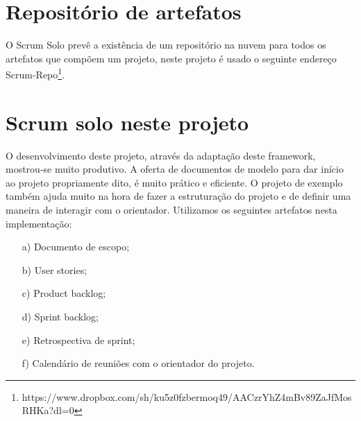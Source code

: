 \section{Repositório de artefatos}
O Scrum Solo prevê a existência de um repositório na nuvem para todos os artefatos que compõem um projeto, neste projeto é usado o seguinte endereço Scrum-Repo\footnote{https://www.dropbox.com/sh/ku5z0fzbermoq49/AACzrYhZ4mBv89ZaJfMosRHKa?dl=0}.

\section{Scrum solo neste projeto}
O desenvolvimento deste projeto, através da adaptação deste framework, mostrou-se muito produtivo. A oferta de documentos de modelo para dar início ao projeto propriamente dito, é muito prático e eficiente. O projeto de exemplo também ajuda muito na hora de fazer a estruturação do projeto e de definir uma maneira de interagir com o orientador. Utilizamos os seguintes artefatos nesta implementação:

\begin{itemize}
    \item[a)] Documento de escopo;
    \item[b)] User stories;
    \item[c)] Product backlog;
    \item[d)] Sprint backlog;
    \item[e)] Retrospectiva de sprint;
    \item[f)] Calendário de reuniões com o orientador do projeto.
\end{itemize}

